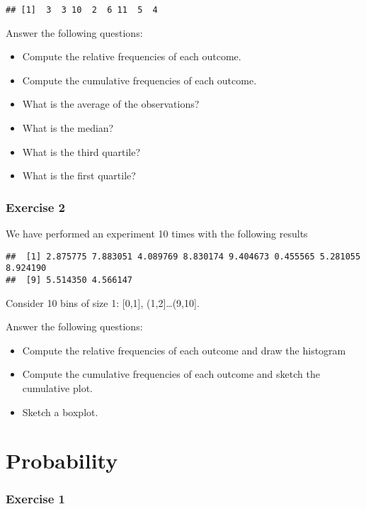 \documentclass[
]{book}
\providecommand{\tightlist}{%
  \setlength{\itemsep}{0pt}\setlength{\parskip}{0pt}}
\begin{document}
\begin{verbatim}
## [1]  3  3 10  2  6 11  5  4
\end{verbatim}

Answer the following questions:

\begin{itemize}
\tightlist
\item
  Compute the relative frequencies of each outcome.
\item
  Compute the cumulative frequencies of each outcome.
\item
  What is the average of the observations?
\item
  What is the median?
\item
  What is the third quartile?
\item
  What is the first quartile?
\end{itemize}

\hypertarget{exercise-2}{%
\subsubsection{Exercise 2}\label{exercise-2}}

We have performed an experiment 10 times with the following results

\begin{verbatim}
##  [1] 2.875775 7.883051 4.089769 8.830174 9.404673 0.455565 5.281055 8.924190
##  [9] 5.514350 4.566147
\end{verbatim}

Consider 10 bins of size 1: {[}0,1{]}, (1,2{]}\ldots(9,10{]}.

Answer the following questions:

\begin{itemize}
\item
  Compute the relative frequencies of each outcome and draw the histogram
\item
  Compute the cumulative frequencies of each outcome and sketch the cumulative plot.
\item
  Sketch a boxplot.
\end{itemize}

\hypertarget{probability-3}{%
\section{Probability}\label{probability-3}}

\hypertarget{exercise-1-1}{%
\subsubsection{Exercise 1}\label{exercise-1-1}}
\end{document}
